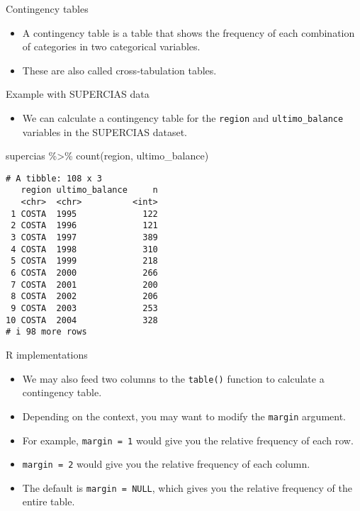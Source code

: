 \documentclass[
  10pt,
  ignorenonframetext,
]{beamer}
\newenvironment{Shaded}{\begin{snugshade}}{\end{snugshade}}
\newcommand{\FunctionTok}[1]{\textcolor[rgb]{0.28,0.35,0.67}{#1}}
\newcommand{\NormalTok}[1]{\textcolor[rgb]{0.00,0.23,0.31}{#1}}
\newcommand{\SpecialCharTok}[1]{\textcolor[rgb]{0.37,0.37,0.37}{#1}}
\providecommand{\tightlist}{%
  \setlength{\itemsep}{0pt}\setlength{\parskip}{0pt}}\usepackage{longtable,booktabs,array}
\begin{document}
\begin{frame}{Contingency tables}
\label{contingency-tables}
\begin{itemize}
\item
  A contingency table is a table that shows the frequency of each
  combination of categories in two categorical variables.
\item
  These are also called cross-tabulation tables.
\end{itemize}
\end{frame}

\begin{frame}[fragile]{Example with SUPERCIAS data}
\label{example-with-supercias-data}
\begin{itemize}
\tightlist
\item
  We can calculate a contingency table for the \texttt{region} and
  \texttt{ultimo\_balance} variables in the SUPERCIAS dataset.
\end{itemize}

\begin{Shaded}
\begin{Highlighting}[]
\NormalTok{supercias }\SpecialCharTok{\%\textgreater{}\%} 
    \FunctionTok{count}\NormalTok{(region, ultimo\_balance)}
\end{Highlighting}
\end{Shaded}

\begin{verbatim}
# A tibble: 108 x 3
   region ultimo_balance     n
   <chr>  <chr>          <int>
 1 COSTA  1995             122
 2 COSTA  1996             121
 3 COSTA  1997             389
 4 COSTA  1998             310
 5 COSTA  1999             218
 6 COSTA  2000             266
 7 COSTA  2001             200
 8 COSTA  2002             206
 9 COSTA  2003             253
10 COSTA  2004             328
# i 98 more rows
\end{verbatim}
\end{frame}

\begin{frame}[fragile]{R implementations}
\label{r-implementations}
\begin{itemize}
\item
  We may also feed two columns to the \texttt{table()} function to
  calculate a contingency table.
\item
  Depending on the context, you may want to modify the \texttt{margin}
  argument.
\item
  For example, \texttt{margin\ =\ 1} would give you the relative
  frequency of each row.
\item
  \texttt{margin\ =\ 2} would give you the relative frequency of each
  column.
\item
  The default is \texttt{margin\ =\ NULL}, which gives you the relative
  frequency of the entire table.
\end{itemize}
\end{frame}
\end{document}
